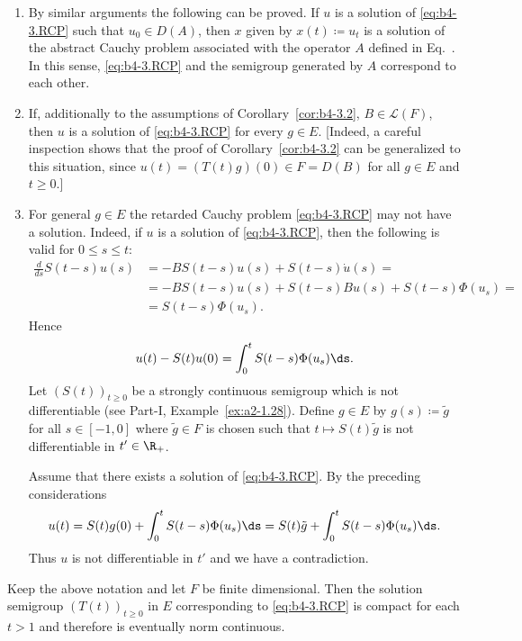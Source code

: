 \begin{remarks*} 
\begin{enumerate}[\upshape (i), wide, labelindent=.25em]

\item 
By similar arguments the following can be proved. 
If\/ $u$ is a solution of \eqref{eq:b4-3.RCP} such that $u_{0} \in D(A)$, then $x$ given by $x(t) \coloneq  u_t$ is a solution of the abstract Cauchy problem associated with the operator $A$ defined in Eq.~. 
In this sense, \eqref{eq:b4-3.RCP} and the semigroup generated by $A$ correspond to each other.

\item 
If, additionally to the assumptions of Corollary~\ref{cor:b4-3.2}, $B \in \mathcal{L}(F)$, then $u$ is a solution of \eqref{eq:b4-3.RCP} for every $g \in E$. 
[Indeed, a careful inspection shows that the proof of Corollary~\ref{cor:b4-3.2} can be generalized to this situation, since $u(t) = (T(t)g)(0) \in F = D(B)$ for all $g \in E$ and $t \geq 0$.]

\item 
For general $g \in E$ the retarded Cauchy problem \eqref{eq:b4-3.RCP} may not have a solution. 
Indeed, if\/ $u$ is a solution of \eqref{eq:b4-3.RCP}, then the following is valid for $0 \leq s \leq t$:
\begin{equation*}
	\begin{aligned}
\frac{d}{ds}S(t-s)u(s) &= -BS(t-s)u(s) + S(t-s)\dot{u}(s) =\\
& = -BS(t-s)u(s) + S(t-s)Bu(s) + S(t-s)\Phi(u_s) = \\ & =S(t-s)\Phi(u_s) .
\end{aligned}
\end{equation*} 
Hence
\[
u(t) - S(t)u(0) = \int_0^t S(t-s)\Phi(u_s)  \ds .
\]
Let $(S(t))_{t \geq 0}$ be a strongly continuous semigroup which is not differentiable (see  Part-I, Example~\ref{ex:a2-1.28}). 
Define $g \in E$ by $g(s)  \coloneq  \tilde{g}$ for all $s \in [-1,0]$ where $\tilde{g} \in F$ is chosen such that
$t \mapsto S(t)\tilde{g}$ is not differentiable in $t' \in \R_+$.

Assume that there exists a solution of \eqref{eq:b4-3.RCP}. 
By the preceding considerations
\[
u(t) = S(t)g(0) + \int_0^t S(t-s)\Phi(u_s)  \ds  = S(t)\tilde{g} + \int_0^t S(t-s)\Phi(u_s)  \ds  .
\]
Thus $u$ is not differentiable in $t'$ and we have a contradiction.
\end{enumerate}
\end{remarks*}
\begin{corollary}\label{cor:b4-3.3}
	Keep the above notation and let $F$ be finite dimensional. 
    Then the solution semigroup $(T(t))_{t \geq 0}$ in $E$ corresponding to \eqref{eq:b4-3.RCP} is compact for each $t > 1$ and therefore is eventually norm continuous.
\end{corollary}

